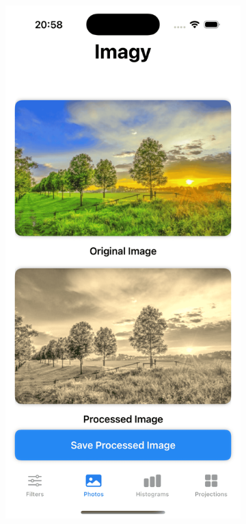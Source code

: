\documentclass[a4paper]{article}
\begin{document}
\begin{figure}[H]
    \centering
    \begin{subfigure}{0.2\textwidth}
        \centering
        \includegraphics[width=\linewidth]{images/trees_sepia.png}

\end{subfigure}
\end{figure}
\end{document}
